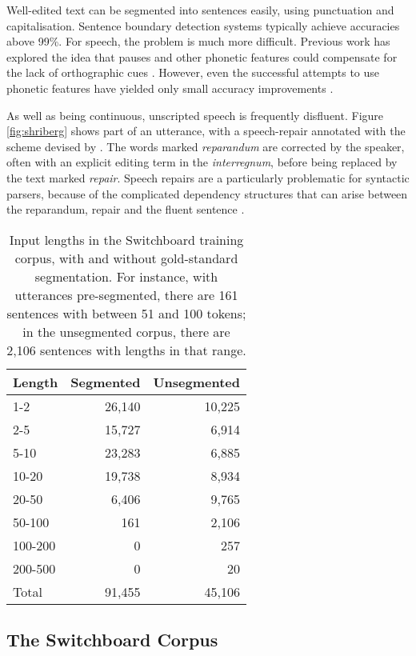 \documentclass[11pt,letterpaper]{article}
\begin{document}
Well-edited text can be segmented into sentences easily, using punctuation and
capitalisation.  Sentence boundary detection systems typically achieve accuracies
above 99\%.  For speech, the problem is much more difficult.  Previous work has
explored the idea that pauses and other phonetic features could compensate
for the lack of orthographic cues \citep{mischa:??}.  However, even the
successful attempts to use phonetic features have yielded only small accuracy
improvements \citep{isi}.

As well as being continuous, unscripted speech is frequently disfluent.
Figure \ref{fig:shriberg} shows part of an utterance, with a speech-repair annotated
with the scheme devised by \citet{shriberg:94}.  The words marked \emph{reparandum}
are corrected by the speaker, often with an explicit editing term in the
\emph{interregnum}, before being replaced by the text marked \emph{repair}.
Speech repairs are a particularly problematic for syntactic
parsers, because of the complicated dependency structures that can arise between the
reparandum, repair and the fluent sentence \citep{Johnson04a}.

\begin{table}
\centering
\small
\begin{tabular}{l|rr}
    \hline
    Length & Segmented & Unsegmented \\
    \hline \hline
    1-2 & 26,140 & 10,225 \\
    2-5 & 15,727 & 6,914 \\
    5-10 & 23,283 & 6,885 \\
    10-20 & 19,738 &  8,934 \\
    20-50 & 6,406 & 9,765 \\
    50-100 & 161 & 2,106 \\
    100-200 & 0 & 257 \\
    200-500 & 0 & 20 \\
    \hline
    Total & 91,455 & 45,106 \\
    \hline
\end{tabular}
\caption{\small Input lengths in the Switchboard training corpus, with and without
    gold-standard segmentation.  For instance, with utterances pre-segmented,
    there are 161 sentences with between 51 and 100 tokens; in the unsegmented
corpus, there are 2,106 sentences with lengths in that range.
\label{tab:seg_freqs}}
\vspace*{-3em}
\end{table}

\subsection{The Switchboard Corpus}
\end{document}
